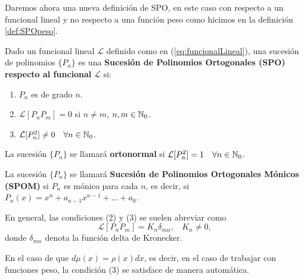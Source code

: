 Daremos ahora una nueva definición de SPO, en este caso con respecto a un funcional lineal y no respecto a una función peso como hicimos en la definición \ref{def:SPOpeso}.

\begin{definicion}
    \label{def:SPOfuncional}
    Dado un funcional lineal $\mathcal{L}$ definido como en (\ref{eq:funcionalLineal}), una sucesión de polinomios $\{P_n\}$ es una \textbf{Sucesión de Polinomios Ortogonales (SPO) respecto al funcional }$\mathcal{L}$ si:
    \begin{enumerate}
        \item $P_n$ es de grado $n$.
        \item $\mathcal{L}[P_n P_m]=0$ si $n\not=m$, $n,m\in\mathbb{N}_0$.
        \item $\mathcal{L}[P_n^2]\not=0 \ \ \ \forall n\in\mathbb{N}_0$.
    \end{enumerate} 

    La sucesión $\{P_n\}$ se llamará \textbf{ortonormal} si $\mathcal{L}[P_n^2]=1 \ \ \ \forall n\in\mathbb{N}_0$.

    La sucesión $\{P_n\}$ se llamará \textbf{Sucesión de Polinomios Ortogonales Mónicos (SPOM)} si $P_n$ es mónico para cada $n$, es decir, si $P_n(x)=x^n + a_{n-1}x^{n-1}+\dots + a_0$.


\end{definicion}

En general, las condiciones (2) y (3) se suelen abreviar como 
$$
\mathcal{L}[P_n P_m]=K_n\delta_{mn}, \ \ \ \ K_n\not=0,
$$
donde $\delta_{mn}$ denota la función delta de Kronecker. 

En el caso de que $d\mu(x)=\rho(x)dx$, es decir, en el caso de trabajar con funciones peso, la condición (3) se satisface de manera automática.

